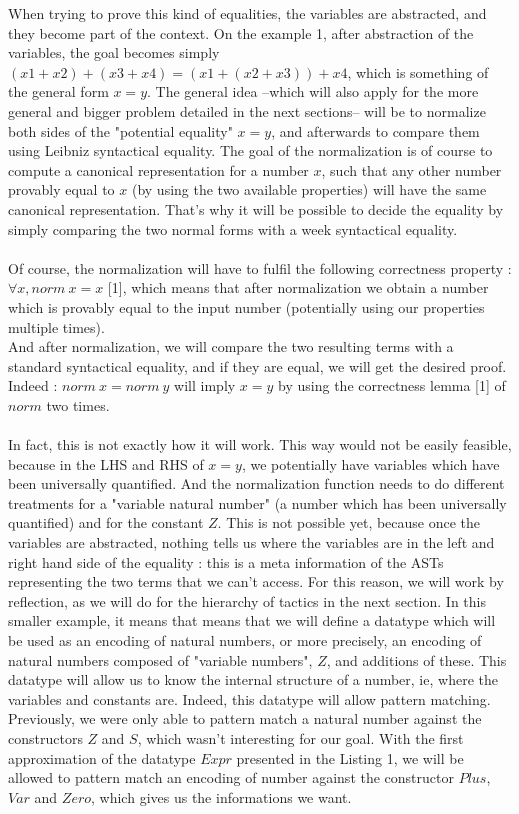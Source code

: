 \documentclass{sigplanconf}
\begin{document}
When trying to prove this kind of equalities, the variables are abstracted, and they become part of the context. On the example 1, after abstraction of the variables, the goal becomes simply $(x1 + x2) + (x3 + x4) = (x1 + (x2 + x3)) + x4$, which is something of the general form $x=y$.
The general idea --which will also apply for the more general and bigger problem detailed in the next sections-- will be to normalize both sides of the "potential equality" $x=y$, and afterwards to compare them using Leibniz syntactical equality.
The goal of the normalization is of course to compute a canonical representation for a number $x$, such that any other number provably equal to $x$ (by using the two available properties) will have the same canonical representation. That's why it will be possible to decide the equality by simply comparing the two normal forms with a week syntactical equality. \\
\\
Of course, the normalization will have to fulfil the following correctness property :
$\forall x, norm\ x = x$ [1], which means that after normalization we obtain a number which is provably equal to the input number (potentially using our properties multiple times). \\
And after normalization, we will compare the two resulting terms with a standard syntactical equality, and if they are equal, we will get the desired proof.  \\
Indeed :
$norm\ x = norm\ y$ will imply $x=y$ by using the correctness lemma [1] of $norm$ two times. \\
\\
In fact, this is not exactly how it will work. This way would not be easily feasible, because in the LHS and RHS of $x=y$, we potentially have variables which have been universally quantified. And the normalization function needs to do different treatments for a "variable natural number" (a number which has been universally quantified) and for the constant $Z$. This is not possible yet, because once the variables are abstracted, nothing tells us where the variables are in the left and right hand side of the equality : this is a meta information of the ASTs representing the two terms that we can't access.
For this reason, we will work by reflection, as we will do for the hierarchy of tactics in the next section. In this smaller example, it means that means that we will define a datatype which will be used as an encoding of natural numbers, or more precisely, an encoding of natural numbers composed of "variable numbers", $Z$, and additions of these. This datatype will allow us to know the internal structure of a number, ie, where the variables and constants are.
Indeed, this datatype will allow pattern matching. Previously, we were only able to pattern match a natural number against the constructors $Z$ and $S$, which wasn't interesting for our goal.  With the first approximation of the datatype $Expr$ presented in the Listing 1, we will be allowed to pattern match an encoding of number against the constructor $Plus$, $Var$ and $Zero$, which gives us the informations we want.
\end{document}
